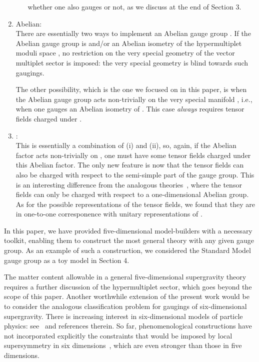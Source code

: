 \documentclass[a4paper,11pt]{article}
\providecommand{\M}{\ensuremath{\mathcal{M}}}
\begin{document}
\begin{enumerate}
\begin{itemize}
whether one also gauges \coordHE{} or not, as we discuss at the end of Section 3.
\end{itemize}
\item {}\coordHE{} Abelian:\\
There are essentially two ways to implement an Abelian gauge group \coordHE{}.
If the Abelian gauge group is \coordHE{} and/or an Abelian isometry
of the hypermultiplet moduli space \myHighlight{$\M_{Q}$}\coordHE{}, no restriction on the
very special geometry of the vector multiplet sector is imposed:
the very special geometry is blind towards such gaugings.

The other possibility, which is the one we focused on in this paper,
is when the Abelian gauge group acts non-trivially on the 
very special manifold \myHighlight{$\M_{VS}$}\coordHE{}, i.e., when one gauges an Abelian isometry 
of \myHighlight{$\M_{VS}$}\coordHE{}. This case \emph{always} requires tensor fields charged under 
\coordHE{}.

\item {}\coordHE{}:\\
This is essentially a combination of (i) and (ii), so, again, if the
Abelian factor acts non-trivially on \myHighlight{$\M_{VS}$}\coordHE{}, one must have some tensor 
fields charged under this Abelian factor. The only new feature is now that 
the tensor fields can also be charged with respect to the semi-simple part 
of the gauge group. This is an interesting difference from the analogous 
\coordHE{} theories~\cite{DHZ}, where the tensor fields can only 
be charged with respect to a one-dimensional Abelian group. 
As for the possible 
\coordHE{} representations of the tensor fields, we found that they are in 
one-to-one corresponence with unitary representations of \coordHE{}.
\end{enumerate}

In this paper, we have provided five-dimensional model-builders with a
necessary toolkit, enabling them to construct the most general theory with
any given gauge group. As an example of such a construction, we considered
the Standard Model gauge group as a toy model in Section 4. 

The matter content allowable in a general five-dimensional \coordHE{}
supergravity theory requires a further discussion of the hypermultiplet
sector, which goes beyond the scope of this paper. Another worthwhile
extension of the present work would be to consider the analogous
classification problem for gaugings of six-dimensional supergravity. There
is increasing interest in six-dimensional models of particle physics: 
see~\cite{HNOS} and references therein. So far, phenomenological
constructions have not incorporated explicitly the constraints that would
be imposed by local supersymmetry in six dimensions~\cite{sixd}, which are
even stronger than those in five dimensions. 
\end{document}
